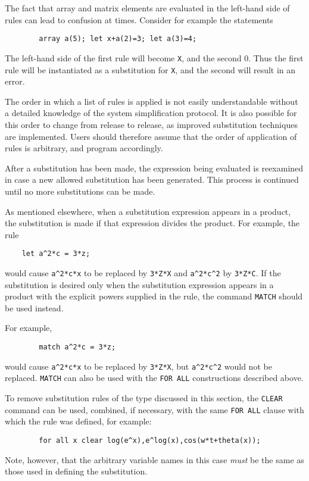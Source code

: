 The fact that array and matrix elements are evaluated in the left-hand side
of rules can lead to confusion at times. Consider for example the
statements
\begin{verbatim}
        array a(5); let x+a(2)=3; let a(3)=4;
\end{verbatim}
The left-hand side of the first rule will become {\tt X}, and the second
0.  Thus the first rule will be instantiated as a substitution for
{\tt X}, and the second will result in an error.

The order in which a list of rules is applied is not easily understandable
without a detailed knowledge of the system simplification protocol. It is
also possible for this order to change from release to release, as improved
substitution techniques are implemented. Users should therefore assume
that the order of application of rules is arbitrary, and program
accordingly.

After a substitution has been made, the expression being evaluated is
reexamined in case a new allowed substitution has been generated. This
process is continued until no more substitutions can be made.

\hypertarget{command:MATCH}{}
As mentioned elsewhere, when a substitution expression appears in a
product, the substitution is made if that expression divides the product.
For example, the rule
\begin{verbatim}
	let a^2*c = 3*z;
\end{verbatim}
would cause {\tt a\verb|^|2*c*x} to be replaced by {\tt 3*Z*X} and
{\tt a\verb|^|2*c\verb|^|2} by {\tt 3*Z*C}.  If the substitution is desired only
when the substitution expression appears in a product with the explicit
powers supplied in the rule, the command {\tt MATCH} should be used
instead.

For example,
\begin{verbatim}
        match a^2*c = 3*z;
\end{verbatim}
would cause {\tt a\verb|^|2*c*x} to be replaced by {\tt 3*Z*X}, but
{\tt a\verb|^|2*c\verb|^|2} would not be replaced. {\tt MATCH} can also be used
with the {\tt FOR ALL} constructions described above.

To remove substitution rules of the type discussed in this section, the
{\tt CLEAR} command can be used, combined, if necessary,
with the same {\tt FOR ALL} clause with which the rule was defined, for
example:
\begin{verbatim}
        for all x clear log(e^x),e^log(x),cos(w*t+theta(x));
\end{verbatim}
Note, however, that the arbitrary variable names in this case {\em must\/}
be the same as those used in defining the substitution.

